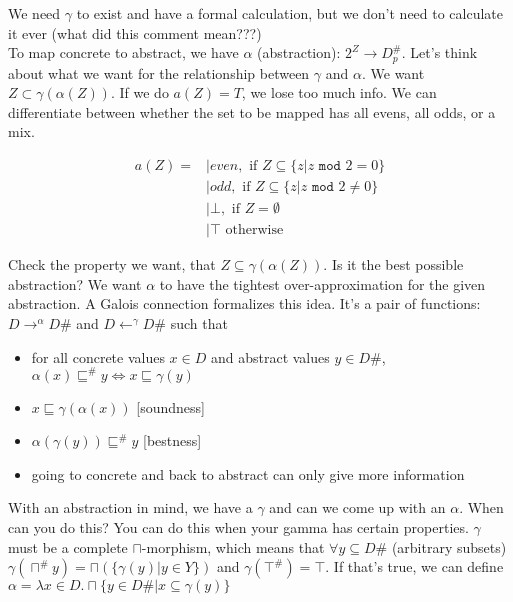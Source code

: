 \documentclass[11pt]{article}
\theoremstyle{definition}
\theoremstyle{plain}
\newcommand{\bottom}{\bot}
\begin{document}
\noindent We need $\gamma$ to exist and have a formal calculation, 
but we don't need to calculate it ever (what did this comment mean???)\\

\noindent To map concrete to abstract, we have $\alpha$ (abstraction): $2^Z \rightarrow D^\#_p$. Let's think about what we want for 
the relationship between $\gamma$ and $\alpha$. We want $Z \subset \gamma(\alpha(Z))$. If we do $a(Z) = T$, we lose too much info.
We can differentiate between whether the set to be mapped has all evens, all odds, or a mix.

\begin{align*}
    a(Z) = &|even, \textrm{ if } Z \subseteq \{z | z \texttt{ mod }2 = 0\}\\
           &|odd, \textrm{ if } Z \subseteq \{z | z \texttt{ mod }2 \neq 0\}\\
           &|\bottom, \textrm{ if } Z=\emptyset\\
           &|\top \textrm{ otherwise }
\end{align*}

\noindent Check the property we want, that $Z \subseteq \gamma(\alpha(Z))$.
Is it the best possible abstraction? We want $\alpha$ to have the tightest over-approximation for the given abstraction.
A Galois connection formalizes this idea. It's a pair of functions: $D \rightarrow^\alpha D\#$ and $D \leftarrow^\gamma D\#$
such that 
\begin{itemize}
    \item for all concrete values $x \in D$ and abstract values $y \in D\#$,  $\alpha(x) \sqsubseteq^\# y \iff  x \sqsubseteq \gamma(y)$
    \item $x \sqsubseteq \gamma(\alpha(x))$   [soundness] 
    \item $\alpha(\gamma(y)) \sqsubseteq^\# y$ [bestness]
    \item going to concrete and back to abstract can only give more information
\end{itemize}

\noindent With an abstraction in mind, we have a $\gamma$ and can we come up with an $\alpha$. 
When can you do this? You can do this when your gamma has certain properties.
$\gamma$ must be a complete $\sqcap$-morphism, which means that $\forall y \subseteq D\#$ (arbitrary subsets) 
$\gamma(\sqcap^\# y) = \sqcap( \{\gamma(y) | y \in Y \})$ and $\gamma(\top^\#)=\top$. 
If that's true, we can define $\alpha = \lambda x \in D . \sqcap\{y \in D\# | x \subseteq \gamma(y)\}$\\
\end{document}
